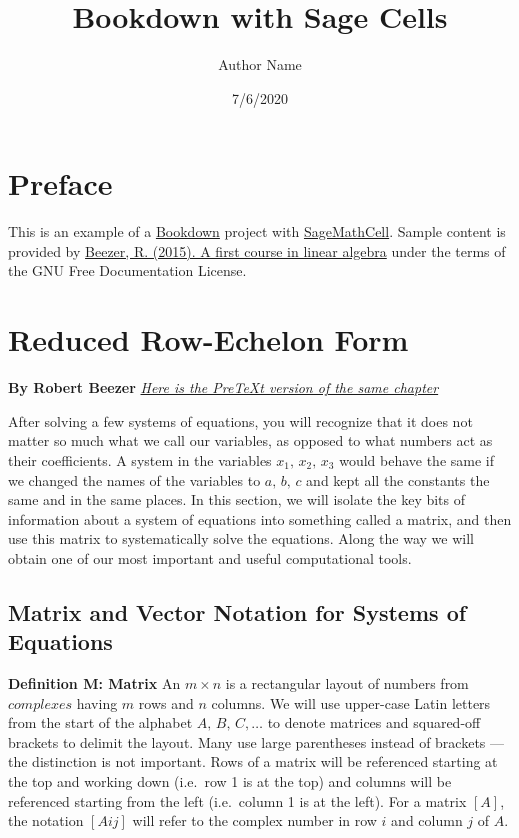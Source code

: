 \documentclass[openany]{book}
\title{Bookdown with Sage Cells}
\author{Author Name}
\date{7/6/2020}
\begin{document}
\maketitle

{
\setcounter{tocdepth}{1}
\tableofcontents
}
\chapter*{Preface}\label{preface}

This is an example of a \href{https://bookdown.org}{Bookdown} project
with \href{https://sagecell.sagemath.org}{SageMathCell}. Sample content
is provided by \href{http://linear.ups.edu/html/fcla.html}{Beezer, R.
(2015). A first course in linear algebra} under the terms of the GNU
Free Documentation License.

\begin{compute}
\end{compute}

\chapter{Reduced Row-Echelon Form}\label{reduced-row-echelon-form}

\textbf{By Robert Beezer}
\emph{\href{https://github.com/rbeezer/fcla/blob/master/src2/section-RREF.xml}{Here
is the PreTeXt version of the same chapter}}

After solving a few systems of equations, you will recognize that it
does not matter so much what we call our variables, as opposed to what
numbers act as their coefficients. A system in the variables
\(x_1,\,x_2,\,x_3\) would behave the same if we changed the names of the
variables to \(a,\,b,\,c\) and kept all the constants the same and in
the same places. In this section, we will isolate the key bits of
information about a system of equations into something called a matrix,
and then use this matrix to systematically solve the equations. Along
the way we will obtain one of our most important and useful
computational tools.

\section{Matrix and Vector Notation for Systems of
Equations}\label{matrix-and-vector-notation-for-systems-of-equations}

\textbf{Definition M: Matrix} An \(m\times n\) is a rectangular layout
of numbers from \(complexes\) having \(m\) rows and \(n\) columns. We
will use upper-case Latin letters from the start of the alphabet
\(A,\,B,\,C,\dotsc\) to denote matrices and squared-off brackets to
delimit the layout. Many use large parentheses instead of brackets ---
the distinction is not important. Rows of a matrix will be referenced
starting at the top and working down (i.e.~row 1 is at the top) and
columns will be referenced starting from the left (i.e.~column 1 is at
the left). For a matrix \([A]\), the notation \([{A}{ij}]\) will refer
to the complex number in row \(i\) and column \(j\) of \(A\).
\end{document}
